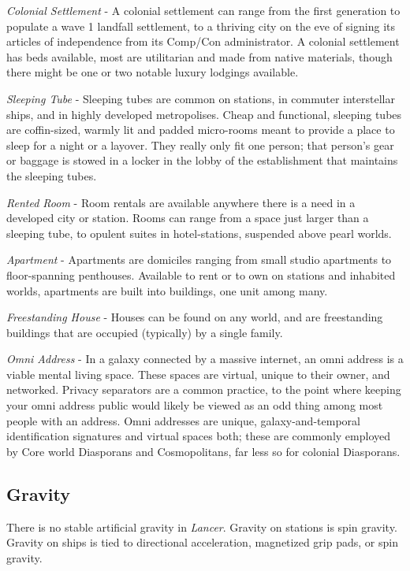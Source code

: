 \textit{Colonial Settlement} - A colonial settlement can range from the first generation to populate a
wave 1 landfall settlement, to a thriving city on the eve of signing its articles of independence
from its Comp/Con administrator. A colonial settlement has beds available, most are utilitarian
and made from native materials, though there might be one or two notable luxury lodgings
available.

\textit{Sleeping Tube} - Sleeping tubes are common on stations, in commuter interstellar ships, and in
highly developed metropolises. Cheap and functional, sleeping tubes are coffin-sized, warmly lit
and padded micro-rooms meant to provide a place to sleep for a night or a layover. They really
only fit one person; that person’s gear or baggage is stowed in a locker in the lobby of the
establishment that maintains the sleeping tubes.

\textit{Rented Room} - Room rentals are available anywhere there is a need in a developed city or
station. Rooms can range from a space just larger than a sleeping tube, to opulent suites in
hotel-stations, suspended above pearl worlds.

\textit{Apartment} - Apartments are domiciles ranging from small studio apartments to floor-spanning
penthouses. Available to rent or to own on stations and inhabited worlds, apartments are built
into buildings, one unit among many.

\textit{Freestanding House} - Houses can be found on any world, and are freestanding buildings that are
occupied (typically) by a single family.

\textit{Omni Address} - In a galaxy connected by a massive internet, an omni address is a viable mental
living space. These spaces are virtual, unique to their owner, and networked. Privacy separators
are a common practice, to the point where keeping your omni address public would likely be
viewed as an odd thing among most people with an address. Omni addresses are unique,
galaxy-and-temporal identification signatures and virtual spaces both; these are commonly
employed by Core world Diasporans and Cosmopolitans, far less so for colonial Diasporans.

\subsection{Gravity}

There is no stable artificial gravity in \textit{Lancer}. Gravity on stations is spin gravity. Gravity on ships is
tied to directional acceleration, magnetized grip pads, or spin gravity.

